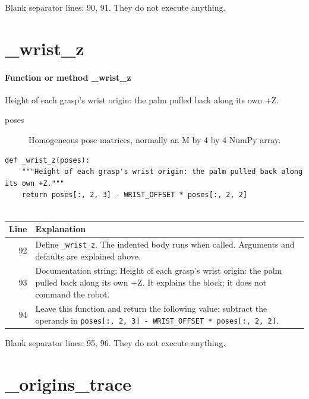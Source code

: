 \documentclass[11pt,a4paper]{book}
\begin{document}
Blank separator lines: 90, 91. They do not execute anything.

\section{\_wrist\_z}

\paragraph{Function or method \_wrist\_z}
Height of each grasp's wrist origin: the palm pulled back along its own +Z.

\begin{description}
\item[poses] Homogeneous pose matrices, normally an M by 4 by 4 NumPy array.
\end{description}

\begin{lstlisting}[firstnumber=92]
def _wrist_z(poses):
    """Height of each grasp's wrist origin: the palm pulled back along its own +Z."""
    return poses[:, 2, 3] - WRIST_OFFSET * poses[:, 2, 2]


\end{lstlisting}

\begin{longtable}{r p{}}

\textbf{Line} & \textbf{Explanation} \\ \hline \endhead

92 & Define \texttt{\_wrist\_z}. The indented body runs when called. Arguments and defaults are explained above. \\

93 & Documentation string: Height of each grasp's wrist origin: the palm pulled back along its own +Z. It explains the block; it does not command the robot. \\

94 & Leave this function and return the following value: subtract the operands in \texttt{poses[:, 2, 3] - WRIST\_OFFSET * poses[:, 2, 2]}. \\

\end{longtable}

Blank separator lines: 95, 96. They do not execute anything.

\section{\_origins\_trace}
\end{document}
